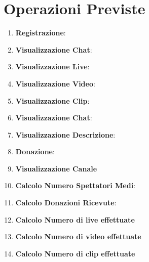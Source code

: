 \section{Operazioni Previste}
\begin{enumerate}
    \item \textbf{Registrazione}: 
    \item \textbf{Visualizzazione Chat}:
    \item \textbf{Visualizzazione Live}: 
    \item \textbf{Visualizzazione Video}:
    \item \textbf{Visualizzazione Clip}: 
    \item \textbf{Visualizzazione Chat}: 
    \item \textbf{Visualizzazione Descrizione}:
    \item \textbf{Donazione}:
    \item \textbf{Visualizzazione Canale}
    \item \textbf{Calcolo Numero Spettatori Medi}:
    \item \textbf{Calcolo Donazioni Ricevute}: 
    \item \textbf{Calcolo Numero di live effettuate} 
    \item \textbf{Calcolo Numero di video effettuate} 
    \item \textbf{Calcolo Numero di clip effettuate} 
\end{enumerate}
